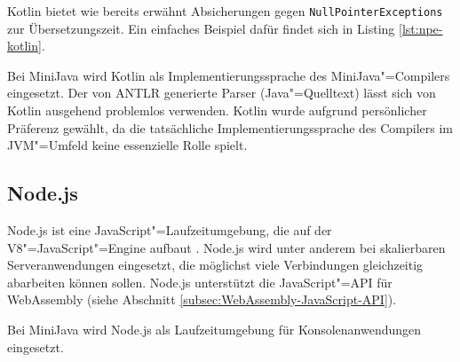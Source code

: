 



Kotlin bietet wie bereits erwähnt Absicherungen gegen \lstinline{NullPointerExceptions} zur Übersetzungszeit. Ein einfaches Beispiel dafür findet sich in Listing \ref{lst:npe-kotlin}.



Bei MiniJava wird Kotlin als Implementierungssprache des MiniJava"=Compilers eingesetzt. Der von ANTLR generierte Parser (Java"=Quelltext) lässt sich von Kotlin ausgehend problemlos verwenden. Kotlin wurde aufgrund persönlicher Präferenz gewählt, da die tatsächliche Implementierungssprache des Compilers im JVM"=Umfeld keine essenzielle Rolle spielt.

\pagebreak
\subsection{Node.js}
Node.js ist eine JavaScript"=Laufzeitumgebung, die auf der V8"=JavaScript"=Engine aufbaut \cite{NodeJSDocumentation}. Node.js wird unter anderem bei skalierbaren Serveranwendungen eingesetzt, die möglichst viele Verbindungen gleichzeitig abarbeiten können sollen. Node.js unterstützt die JavaScript"=API für WebAssembly (siehe Abschnitt \ref{subsec:WebAssembly-JavaScript-API}).

Bei MiniJava wird Node.js als Laufzeitumgebung für Konsolenanwendungen eingesetzt.

